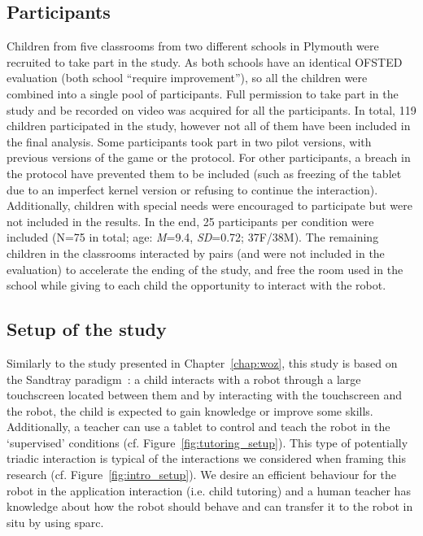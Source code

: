 \subsection{Participants}

Children from five classrooms from two different schools in Plymouth were recruited to take part in the study. As both schools have an identical OFSTED evaluation (both school ``require improvement''), so all the children were combined into a single pool of participants. Full permission to take part in the study and be recorded on video was acquired for all the participants. In total, 119 children participated in the study, however not all of them have been included in the final analysis. Some participants took part in two pilot versions, with previous versions of the game or the protocol. For other participants, a breach in the protocol have prevented them to be included (such as freezing of the tablet due to an imperfect kernel version or refusing to continue the interaction). Additionally, children with special needs were encouraged to participate but were not included in the results. In the end, 25 participants per condition were included (N=75 in total; age: \textit{M}=9.4, \textit{SD}=0.72; 37F/38M). The remaining children in the classrooms interacted by pairs (and were not included in the evaluation) to accelerate the ending of the study, and free the room used in the school while giving to each child the opportunity to interact with the robot. 

\subsection{Setup of the study}

Similarly to the study presented in Chapter~\ref{chap:woz}, this study is based on the Sandtray paradigm~\citep{baxter2012touchscreen}: a child interacts with a robot through a large touchscreen located between them and by interacting with the touchscreen and the robot, the child is expected to gain knowledge or improve some skills. Additionally, a teacher can use a tablet to control and teach the robot in the `supervised' conditions (cf. Figure~\ref{fig:tutoring_setup}). This type of potentially triadic interaction is typical of the interactions we considered when framing this research (cf. Figure~\ref{fig:intro_setup}). We desire an efficient behaviour for the robot in the application interaction (i.e. child tutoring) and a human teacher has knowledge about how the robot should behave and can transfer it to the robot in situ by using \gls{sparc}.

